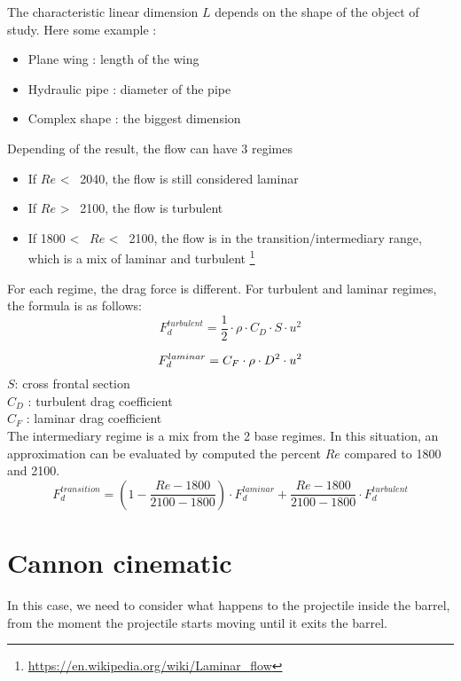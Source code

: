 \documentclass[12pt,a4paper]{article}
\begin{document}
The characteristic linear dimension $L$ depends on the shape of the object of study. Here some example : 
\begin{itemize}
	\item Plane wing : length of the wing
	\item Hydraulic pipe : diameter of the pipe
	\item Complex shape : the biggest dimension
\end{itemize}
Depending of the result, the flow can have 3 regimes

\begin{itemize}
	\item If $Re$ <~ 2040, the flow is still considered laminar 
	\item If $Re$ >~ 2100, the flow is turbulent
	\item If 1800 <~ $Re$ <~ 2100, the flow is in the transition/intermediary range, which is a mix of laminar and turbulent \footnote{\url{https://en.wikipedia.org/wiki/Laminar_flow}}
\end{itemize}

For each regime, the drag force is different. 
For turbulent and laminar regimes, the formula is as follows:
\begin{equation}
	F_d^{turbulent} = \frac{1}{2} \cdot \rho \cdot C_D \cdot S \cdot u^2
\end{equation}

\begin{equation}
	F_d^{laminar} = C_F \cdot \rho \cdot  D^2 \cdot u^2\\
\end{equation}
$S$: cross frontal section\\
$C_D$ : turbulent drag coefficient\\
$C_F$ : laminar drag coefficient\\

The intermediary regime is a mix from the 2 base regimes. In this situation, an approximation can be evaluated by computed the percent $Re$ compared to 1800 and 2100. 
\begin{equation}
	F_d^{transition} = (1- \frac{Re - 1800}{2100-1800}) \cdot F_d^{laminar} + \frac{Re - 1800}{2100-1800} \cdot F_d^{turbulent}
\end{equation}

\section{Cannon cinematic}
In this case, we need to consider what happens to the projectile inside the barrel, from the moment the projectile starts moving until it exits the barrel. 
\end{document}
